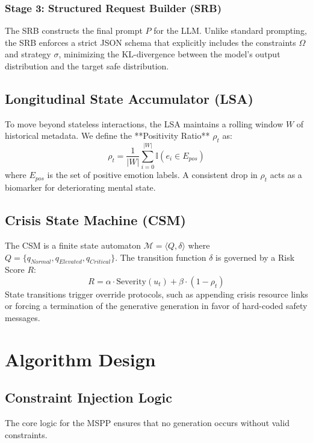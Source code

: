 \documentclass[conference]{IEEEtran}
\begin{document}
\subsubsection{Stage 3: Structured Request Builder (SRB)}
The SRB constructs the final prompt $P$ for the LLM. Unlike standard prompting, the SRB enforces a strict JSON schema that explicitly includes the constraints $\Omega$ and strategy $\sigma$, minimizing the KL-divergence between the model's output distribution and the target safe distribution.

\subsection{Longitudinal State Accumulator (LSA)}
To move beyond stateless interactions, the LSA maintains a rolling window $W$ of historical metadata. We define the **Positivity Ratio** $\rho_t$ as:
\begin{equation}
    \rho_t = \frac{1}{|W|} \sum_{i=0}^{|W|} \mathbb{I}(e_i \in E_{pos})
\end{equation}
where $E_{pos}$ is the set of positive emotion labels. A consistent drop in $\rho_t$ acts as a biomarker for deteriorating mental state.

\subsection{Crisis State Machine (CSM)}
The CSM is a finite state automaton $\mathcal{M} = \langle Q, \delta \rangle$ where $Q = \{q_{Normal}, q_{Elevated}, q_{Critical}\}$. The transition function $\delta$ is governed by a Risk Score $R$:
\begin{equation}
    R = \alpha \cdot \text{Severity}(u_t) + \beta \cdot (1 - \rho_t)
\end{equation}
State transitions trigger override protocols, such as appending crisis resource links or forcing a termination of the generative generation in favor of hard-coded safety messages.

\section{Algorithm Design}

\subsection{Constraint Injection Logic}
The core logic for the MSPP ensures that no generation occurs without valid constraints.
\end{document}
